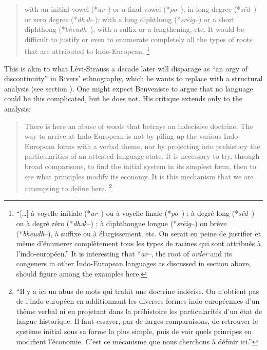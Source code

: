 \documentclass[output=paper]{langscibook}
\begin{document}
\begin{quotation}
with an initial vowel (*\emph{ar}--) or a final vowel (*\emph{po}--); in long degree (*\emph{sēd}--) or zero degree (*\emph{dhək}--); with a long diphthong (*\emph{srēig}--) or a short diphthong (*\emph{bheudh}--), with a suffix or a lengthening, etc. It would be difficult to justify or even to enumerate completely all the types of roots that are attributed to Indo-European. \citep[147]{Benveniste1935}\footnote{``[…] à voyelle initiale (*\emph{ar}--) ou à voyelle finale (*\emph{po}--) ; à degré long (*\emph{sēd}--) ou à degré zéro (*\emph{dhək}--) ; à diphthongue longue (*\emph{srēig}--) ou brève (*\emph{bheudh}--), à suffixe ou à élargissement, etc. On serait en peine de justifier et même d’énumerer complètement tous les types de racines qui sont attribués à l’indo-européen.'' It is interesting that *\emph{ar}--, the root of \emph{order} and its congeners in other Indo-European languages as discussed in section  above, should figure among the examples here.}
\end{quotation}

This is akin to what Lévi-Strauss a decade later will disparage as ``an orgy of discontinuity'' in Rivers' ethnography, which he wants to replace with a structural analysis (see section ). One might expect Benveniste to argue that no language could be this complicated, but he does not. His critique extends only to the analysis:

\begin{quotation}
There is here an abuse of words that betrays an indecisive doctrine. The way to arrive at Indo-European is not by piling up the various Indo-European forms with a verbal theme, nor by projecting into prehistory the particularities of an attested language state. It is necessary to try, through broad comparisons, to find the initial system in its simplest form, then to see what principles modify its economy. It is this mechanism that we are attempting to define here. \citep[147--148]{Benveniste1935}\footnote{``Il y a ici un abus de mots qui trahit une doctrine indécise. On n'obtient pas de l'indo-européen en additionnant les diverses formes indo-européennes d'un thème verbal ni en projetant dans la préhistoire les particularités d'un état de langue historique. Il faut essayer, par de larges comparaisons, de retrouver le système initial sous sa forme la plus simple, puis de voir quels principes en modifient l'économie. C'est ce mécanisme que nous cherchons à définir ici.''}
\end{quotation}
\end{document}
